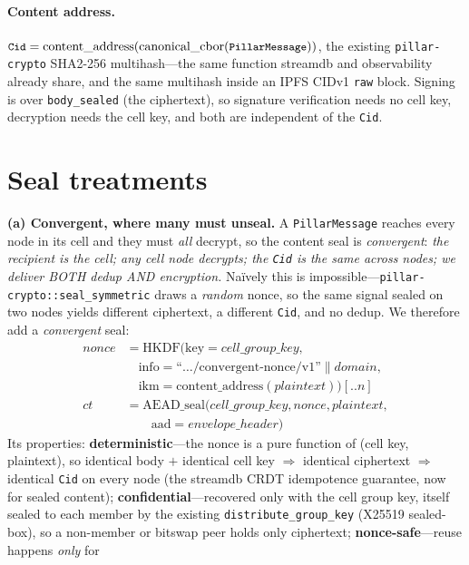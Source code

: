 \documentclass[10pt,twocolumn]{article}
\newcommand{\code}[1]{\texttt{\small #1}}
\newcommand{\Cid}{\code{Cid}}
\begin{document}
\paragraph{Content address.}
$\Cid{}=\mathrm{content\_address}(\mathrm{canonical\_cbor}(\code{PillarMessage}))$,
the existing \code{pillar-crypto} SHA2-256 multihash---the same function streamdb
and observability already share, and the same multihash inside an IPFS CIDv1
\code{raw} block. Signing is over \code{body\_sealed} (the ciphertext), so
signature verification needs no cell key, decryption needs the cell key, and both
are independent of the \Cid{}.

\section{Seal treatments}\label{sec:seal}
\textbf{(a) Convergent, where many must unseal.} A \code{PillarMessage} reaches every
node in its cell and they must \emph{all} decrypt, so the content seal is
\emph{convergent}: \emph{the recipient is the cell; any cell node decrypts; the \Cid{}
is the same across nodes; we deliver BOTH dedup AND encryption.} Na\"ively this is
impossible---\code{pillar-crypto::seal\_symmetric}
draws a \emph{random} nonce, so the same signal sealed on two nodes yields
different ciphertext, a different \Cid{}, and no dedup. We therefore add a
\emph{convergent} seal:
\begin{align*}
\mathit{nonce} &= \mathrm{HKDF}\big(\text{key}{=}\mathit{cell\_group\_key},\\[-1pt]
 &\quad \text{info}{=}\text{``}\dots\text{/convergent-nonce/v1''}\|\mathit{domain},\\[-1pt]
 &\quad \text{ikm}{=}\mathrm{content\_address}(\mathit{plaintext})\big)[..n]\\
\mathit{ct} &= \mathrm{AEAD\_seal}(\mathit{cell\_group\_key},\mathit{nonce},
   \mathit{plaintext},\\[-1pt]
 &\qquad \text{aad}{=}\mathit{envelope\_header})
\end{align*}
Its properties: \textbf{deterministic}---the nonce is a pure function of (cell key,
plaintext), so identical body $+$ identical cell key $\Rightarrow$ identical
ciphertext $\Rightarrow$ identical \Cid{} on every node (the streamdb CRDT
idempotence guarantee, now for sealed content); \textbf{confidential}---recovered
only with the cell group key, itself sealed to each member by the existing
\code{distribute\_group\_key} (X25519 sealed-box), so a non-member or bitswap peer
holds only ciphertext; \textbf{nonce-safe}---reuse happens \emph{only} for
\end{document}
